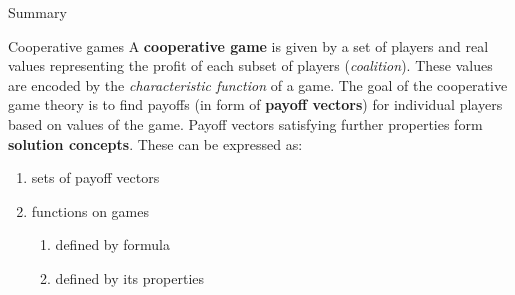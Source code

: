 \documentclass{beamer}
\begin{document}
\begin{frame}{Summary}
    \begin{alertblock}{Cooperative games}
        A \textbf{cooperative game} is given by a set of players and real values representing the profit of each subset of players (\textit{coalition}). These values are encoded by the \textit{characteristic function} of a game. The goal of the cooperative game theory is to find payoffs (in form of \textbf{payoff vectors}) for individual players based on values of the game. Payoff vectors satisfying further properties form \textbf{solution concepts}. These can be expressed as:
        \begin{enumerate}
            \item sets of payoff vectors
            \item functions on games
            \begin{enumerate}
                \item defined by formula
                \item defined by its properties
            \end{enumerate}
        \end{enumerate}
    \end{alertblock}
\end{frame}


	
\end{document}
